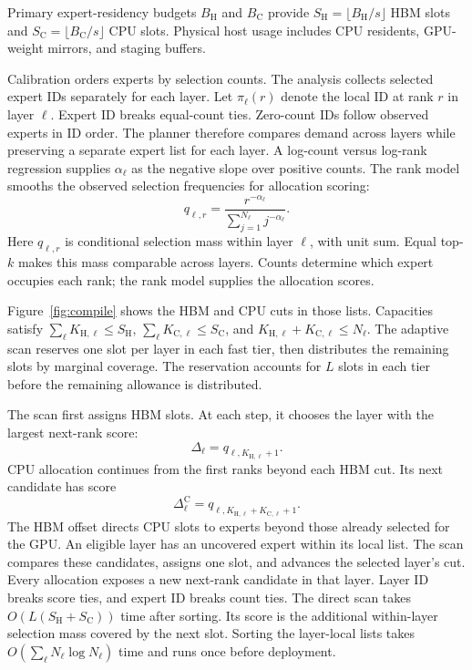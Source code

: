 Primary expert-residency budgets $B_{\mathrm H}$ and $B_{\mathrm C}$ provide $S_{\mathrm H}=\lfloor B_{\mathrm H}/s\rfloor$ HBM slots and $S_{\mathrm C}=\lfloor B_{\mathrm C}/s\rfloor$ CPU slots.
Physical host usage includes CPU residents, GPU-weight mirrors, and staging buffers.

Calibration orders experts by selection counts.
The analysis collects selected expert IDs separately for each layer.
Let $\pi_\ell(r)$ denote the local ID at rank $r$ in layer $\ell$.
Expert ID breaks equal-count ties.
Zero-count IDs follow observed experts in ID order.
The planner therefore compares demand across layers while preserving a separate expert list for each layer.
A log-count versus log-rank regression supplies $\alpha_\ell$ as the negative slope over positive counts.
The rank model smooths the observed selection frequencies for allocation scoring:
\begin{equation}
q_{\ell,r}=\frac{r^{-\alpha_\ell}}{\sum_{j=1}^{N_\ell}j^{-\alpha_\ell}}.
\end{equation}
Here $q_{\ell,r}$ is conditional selection mass within layer $\ell$, with unit sum.
Equal top-$k$ makes this mass comparable across layers.
Counts determine which expert occupies each rank; the rank model supplies the allocation scores.

Figure~\ref{fig:compile} shows the HBM and CPU cuts in those lists.
Capacities satisfy $\sum_\ell K_{\mathrm H,\ell}\le S_{\mathrm H}$, $\sum_\ell K_{\mathrm C,\ell}\le S_{\mathrm C}$, and $K_{\mathrm H,\ell}+K_{\mathrm C,\ell}\le N_\ell$.
The adaptive scan reserves one slot per layer in each fast tier, then distributes the remaining slots by marginal coverage.
The reservation accounts for $L$ slots in each tier before the remaining allowance is distributed.

The scan first assigns HBM slots.
At each step, it chooses the layer with the largest next-rank score:
\begin{equation}
\Delta_\ell=q_{\ell,K_{\mathrm H,\ell}+1}.
\end{equation}
CPU allocation continues from the first ranks beyond each HBM cut.
Its next candidate has score
\begin{equation}
\Delta^{\mathrm C}_\ell=q_{\ell,K_{\mathrm H,\ell}+K_{\mathrm C,\ell}+1}.
\label{eq:cpu_marginal}
\end{equation}
The HBM offset directs CPU slots to experts beyond those already selected for the GPU.
An eligible layer has an uncovered expert within its local list.
The scan compares these candidates, assigns one slot, and advances the selected layer's cut.
Every allocation exposes a new next-rank candidate in that layer.
Layer ID breaks score ties, and expert ID breaks count ties.
The direct scan takes $O(L(S_{\mathrm H}+S_{\mathrm C}))$ time after sorting.
Its score is the additional within-layer selection mass covered by the next slot.
Sorting the layer-local lists takes $O(\sum_\ell N_\ell\log N_\ell)$ time and runs once before deployment.

